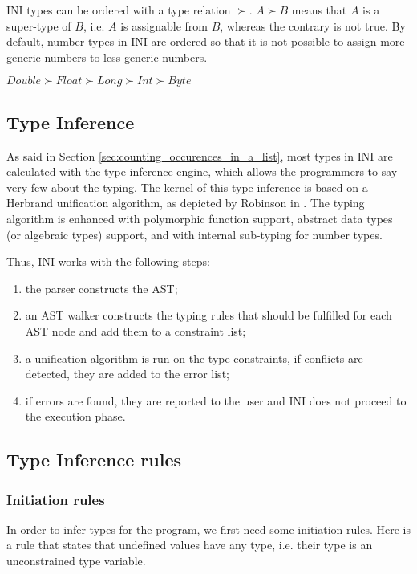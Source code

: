 \documentclass[11pt]{article}
\begin{document}
INI types can be ordered with a type relation $\succ$. $A \succ B$ means that $A$ is a super-type of $B$, i.e. $A$ is assignable from $B$, whereas the contrary is not true. By default, number types in INI are ordered so that it is not possible to assign more generic numbers to less generic numbers.

\begin{center}
$Double \succ Float \succ Long \succ Int \succ Byte$
\end{center}

\subsection{Type Inference}

As said in Section \ref{sec:counting_occurences_in_a_list}, most types in INI are calculated with the type inference engine, which allows the programmers to say very few about the typing. The kernel of this type inference is based on a Herbrand unification algorithm, as depicted by Robinson in \cite{robinson1965}. The typing algorithm is enhanced with polymorphic function support, abstract data types (or algebraic types) support, and with internal sub-typing for number types.

Thus, INI works with the following steps:

\begin{enumerate}
\item the parser constructs the AST;
\item an AST walker constructs the typing rules that should be fulfilled for each AST node and add them to a constraint list;
\item a unification algorithm is run on the type constraints, if conflicts are detected, they are added to the error list;
\item if errors are found, they are reported to the user and INI does not proceed to the execution phase.
\end{enumerate}

\subsection{Type Inference rules}

\subsubsection{Initiation rules}

In order to infer types for the program, we first need some initiation rules. Here is a rule that states that undefined values have any type, i.e. their type is an unconstrained type variable.
\end{document}
